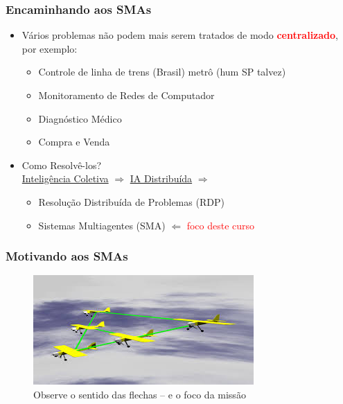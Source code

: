 \begin{frame} %

 \frametitle{Encaminhando aos SMAs}
\begin{itemize}
  \item  Vários problemas não podem mais serem tratados 
  de modo \textcolor{red}{\textbf{centralizado}}, por exemplo:
  \begin{itemize}
    \item Controle de linha de trens (Brasil) metrô (hum SP talvez)
    \item Monitoramento de Redes de Computador
    \item Diagnóstico Médico
    \item Compra e Venda

  \end{itemize}

\pause  
\item Como Resolvê-los?\\
\pause
\underline{Inteligência Coletiva} $ \Rightarrow $ \underline{IA Distribuída}  $ \Rightarrow $

\begin{itemize}
  \item Resolução Distribuída de Problemas (RDP)
  \item Sistemas Multiagentes (SMA) $\Leftarrow $ \textcolor{red}{foco deste curso}
\end{itemize}
\end{itemize}

\end{frame}

\begin{frame}

  \frametitle{Motivando aos SMAs}
    
    
\begin{figure}[!ht]
\centering
\includegraphics[height =.6\textheight,width=.7\textwidth]{figuras/agentes_vizinhos01.jpeg}
\caption{Observe o sentido das flechas --  e  o foco da missão}
\end{figure}
    
    
\end{frame}

